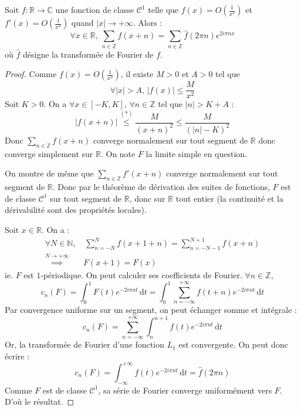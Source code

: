 






  \begin{theorem}
    \label{formule-sommatoire-de-poisson-1}
    Soit $f : \mathbb{R} \rightarrow \mathbb{C}$ une fonction de classe $\mathcal{C}^1$ telle que $f(x) = O \left( \frac{1}{x^2} \right)$ et $f'(x) = O \left( \frac{1}{x^2} \right)$ quand $|x| \longrightarrow +\infty$. Alors :
    \[ \forall x \in \mathbb{R}, \, \sum_{n \in \mathbb{Z}} f(x+n) = \sum_{n \in \mathbb{Z}} \widehat{f}(2 \pi n) e^{2 i \pi n x} \]
    où $\widehat{f}$ désigne la transformée de Fourier de $f$.
  \end{theorem}

  \begin{proof}
    Comme $f(x) = O \left( \frac{1}{x^2} \right)$, il existe $M > 0$ et $A > 0$ tel que
    \[ \forall |x| > A, \, |f(x)| \leq \frac{M}{x^2} \tag{$*$} \]
    Soit $K > 0$. On a $\forall x \in [-K, K]$, $\forall n \in \mathbb{Z}$ tel que $|n| > K + A$ :
    \[ |f(x+n)| \overset{(*)}{\leq} \frac{M}{(x+n)^2} \leq \frac{M}{(|n| - K)^2} \]
    Donc $\sum_{n \in \mathbb{Z}} f(x+n)$ converge normalement sur tout segment de $\mathbb{R}$ donc converge simplement sur $\mathbb{R}$. On note $F$ la limite simple en question.

    \medskip
    On montre de même que $\sum_{n \in \mathbb{Z}} f'(x+n)$ converge normalement sur tout segment de $\mathbb{R}$. Donc par le théorème de dérivation des suites de fonctions, $F$ est de classe $\mathcal{C}^1$ sur tout segment de $\mathbb{R}$, donc sur $\mathbb{R}$ tout entier (la continuité et la dérivabilité sont des propriétés locales).

    \medskip
    Soit $x \in \mathbb{R}$. On a :
    \begin{align*}
      \forall N \in \mathbb{N}, &\, \sum_{n=-N}^N f(x+1+n) = \sum_{n=-N-1}^{N+1} f(x+n) \\
      \overset{N \longrightarrow +\infty}{\implies} & F(x+1) = F(x)
    \end{align*}
    ie. $F$ est $1$-périodique. On peut calculer ses coefficients de Fourier. $\forall n \in \mathbb{Z}$,
    \[ c_n(F) = \int_0^1 F(t) e^{-2i\pi n t} \, \mathrm{d}t = \int_0^1 \sum_{n=-\infty}^{+\infty} f(t+n) e^{-2i\pi n t} \, \mathrm{d}t \]
    Par convergence uniforme sur un segment, on peut échanger somme et intégrale :
    \[ c_n(F) = \sum_{n=-\infty}^{+\infty} \int_n^{n+1} f(t) e^{-2i\pi n t} \, \mathrm{d}t \]
    Or, la transformée de Fourier d'une fonction $L_1$ est convergente. On peut donc écrire :
    \[ c_n(F) = \int_{-\infty}^{+\infty} f(t) e^{-2i\pi n t} \, \mathrm{d}t = \widehat{f}(2\pi n) \]
    Comme $F$ est de classe $\mathcal{C}^1$, sa série de Fourier converge uniformément vers $F$. D'où le résultat.
  \end{proof}

